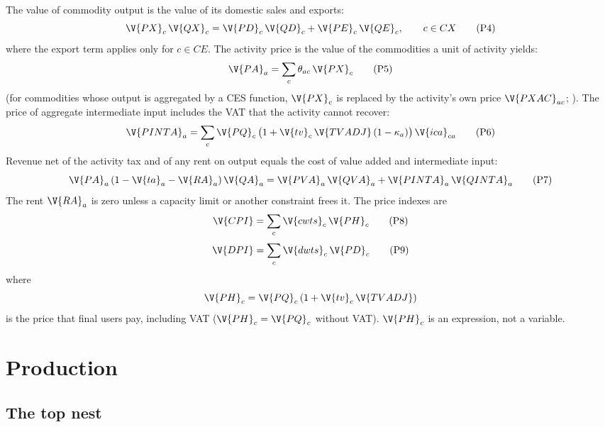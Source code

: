 The value of commodity output is the value of its domestic sales and exports:
\begin{equation}
\V{PX}_c\,\V{QX}_c = \V{PD}_c\,\V{QD}_c + \V{PE}_c\,\V{QE}_c, \qquad c \in CX
\tag{P4}\label{eq:P4}
\end{equation}
where the export term applies only for $c \in CE$. The activity price is the
value of the commodities a unit of activity yields:
\begin{equation}
\V{PA}_a = \sum_c \theta_{ac}\,\V{PX}_c
\tag{P5}\label{eq:P5}
\end{equation}
(for commodities whose output is aggregated by a CES function, $\V{PX}_c$ is
replaced by the activity's own price $\V{PXAC}_{ac}$; ).
The price of aggregate intermediate input includes the VAT that the activity
cannot recover:
\begin{equation}
\V{PINTA}_a = \sum_c \V{PQ}_c\,\bigl(1 + \V{tv}_c\,\V{TVADJ}\,(1 - \kappa_a)\bigr)\,\V{ica}_{ca}
\tag{P6}\label{eq:P6}
\end{equation}
Revenue net of the activity tax and of any rent on output equals the cost of
value added and intermediate input:
\begin{equation}
\V{PA}_a\,(1 - \V{ta}_a - \V{RA}_a)\,\V{QA}_a = \V{PVA}_a\,\V{QVA}_a + \V{PINTA}_a\,\V{QINTA}_a
\tag{P7}\label{eq:P7}
\end{equation}
The rent $\V{RA}_a$ is zero unless a capacity limit or another constraint
frees it. The price indexes are
\begin{equation}
\V{CPI} = \sum_c \V{cwts}_c\,\V{PH}_c
\tag{P8}\label{eq:P8}
\end{equation}
\begin{equation}
\V{DPI} = \sum_c \V{dwts}_c\,\V{PD}_c
\tag{P9}\label{eq:P9}
\end{equation}
where
\begin{equation*}
\V{PH}_c = \V{PQ}_c\,(1 + \V{tv}_c\,\V{TVADJ})
\end{equation*}
is the price that final users pay, including VAT ($\V{PH}_c = \V{PQ}_c$ without
VAT). $\V{PH}_c$ is an expression, not a variable.

\section{Production}\label{sec:production}

\subsection{The top nest}

